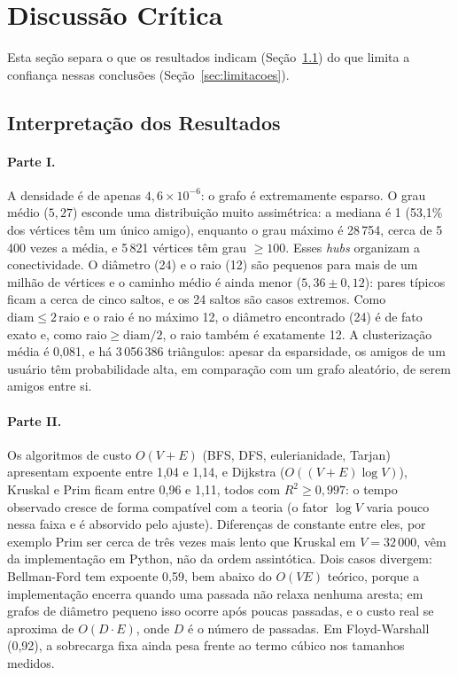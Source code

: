 \documentclass[sigconf]{webmedia}
\begin{document}
\section{Discussão Crítica}
\label{sec:discussao}
Esta seção separa o que os resultados indicam (Seção~\ref{sec:interpretacao}) do que limita a confiança nessas conclusões (Seção~\ref{sec:limitacoes}).

\subsection{Interpretação dos Resultados}
\label{sec:interpretacao}
\paragraph{Parte I.} A densidade é de apenas $4{,}6\times10^{-6}$: o grafo é extremamente esparso. O grau médio ($5{,}27$) esconde uma distribuição muito assimétrica: a mediana é 1 (53,1\% dos vértices têm um único amigo), enquanto o grau máximo é 28\,754, cerca de 5\,400 vezes a média, e 5\,821 vértices têm grau $\geq100$. Esses \emph{hubs} organizam a conectividade. O diâmetro (24) e o raio (12) são pequenos para mais de um milhão de vértices e o caminho médio é ainda menor ($5{,}36\pm0{,}12$): pares típicos ficam a cerca de cinco saltos, e os 24 saltos são casos extremos. Como $\mathrm{diam}\le 2\,\mathrm{raio}$ e o raio é no máximo 12, o diâmetro encontrado (24) é de fato exato e, como $\mathrm{raio}\ge\mathrm{diam}/2$, o raio também é exatamente 12. A clusterização média é 0,081, e há 3\,056\,386 triângulos: apesar da esparsidade, os amigos de um usuário têm probabilidade alta, em comparação com um grafo aleatório, de serem amigos entre si.

\paragraph{Parte II.} Os algoritmos de custo $O(V+E)$ (BFS, DFS, eulerianidade, Tarjan) apresentam expoente entre 1,04 e 1,14, e Dijkstra ($O((V+E)\log V)$), Kruskal e Prim ficam entre 0,96 e 1,11, todos com $R^2\ge0{,}997$: o tempo observado cresce de forma compatível com a teoria (o fator $\log V$ varia pouco nessa faixa e é absorvido pelo ajuste). Diferenças de constante entre eles, por exemplo Prim ser cerca de três vezes mais lento que Kruskal em $V=32\,000$, vêm da implementação em Python, não da ordem assintótica. Dois casos divergem: Bellman-Ford tem expoente 0,59, bem abaixo do $O(VE)$ teórico, porque a implementação encerra quando uma passada não relaxa nenhuma aresta; em grafos de diâmetro pequeno isso ocorre após poucas passadas, e o custo real se aproxima de $O(D\cdot E)$, onde $D$ é o número de passadas. Em Floyd-Warshall (0,92), a sobrecarga fixa ainda pesa frente ao termo cúbico nos tamanhos medidos.
\end{document}
